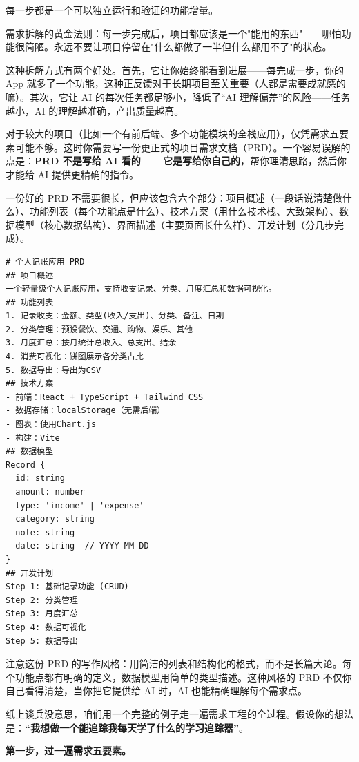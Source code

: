 每一步都是一个可以独立运行和验证的功能增量。

需求拆解的黄金法则：每一步完成后，项目都应该是一个"能用的东西"——哪怕功能很简陋。永远不要让项目停留在"什么都做了一半但什么都用不了"的状态。

这种拆解方式有两个好处。首先，它让你始终能看到进展——每完成一步，你的 App 就多了一个功能，这种正反馈对于长期项目至关重要（人都是需要成就感的嘛）。其次，它让 AI 的每次任务都足够小，降低了“AI 理解偏差”的风险——任务越小，AI 的理解越准确，产出质量越高。


对于较大的项目（比如一个有前后端、多个功能模块的全栈应用），仅凭需求五要素可能不够。这时你需要写一份更正式的项目需求文档（PRD）。一个容易误解的点是：\textbf{PRD 不是写给 AI 看的——它是写给你自己的}，帮你理清思路，然后你才能给 AI 提供更精确的指令。

一份好的 PRD 不需要很长，但应该包含六个部分：项目概述（一段话说清楚做什么）、功能列表（每个功能点是什么）、技术方案（用什么技术栈、大致架构）、数据模型（核心数据结构）、界面描述（主要页面长什么样）、开发计划（分几步完成）。

\begin{lstlisting}
# 个人记账应用 PRD
## 项目概述
一个轻量级个人记账应用，支持收支记录、分类、月度汇总和数据可视化。
## 功能列表
1. 记录收支：金额、类型(收入/支出)、分类、备注、日期
2. 分类管理：预设餐饮、交通、购物、娱乐、其他
3. 月度汇总：按月统计总收入、总支出、结余
4. 消费可视化：饼图展示各分类占比
5. 数据导出：导出为CSV
## 技术方案
- 前端：React + TypeScript + Tailwind CSS
- 数据存储：localStorage（无需后端）
- 图表：使用Chart.js
- 构建：Vite
## 数据模型
Record {
  id: string
  amount: number
  type: 'income' | 'expense'
  category: string
  note: string
  date: string  // YYYY-MM-DD
}
## 开发计划
Step 1: 基础记录功能 (CRUD)
Step 2: 分类管理
Step 3: 月度汇总
Step 4: 数据可视化
Step 5: 数据导出
\end{lstlisting}

注意这份 PRD 的写作风格：用简洁的列表和结构化的格式，而不是长篇大论。每个功能点都有明确的定义，数据模型用简单的类型描述。这种风格的 PRD 不仅你自己看得清楚，当你把它提供给 AI 时，AI 也能精确理解每个需求点。


纸上谈兵没意思，咱们用一个完整的例子走一遍需求工程的全过程。假设你的想法是：\textbf{“我想做一个能追踪我每天学了什么的学习追踪器”}。

\textbf{第一步，过一遍需求五要素。}

